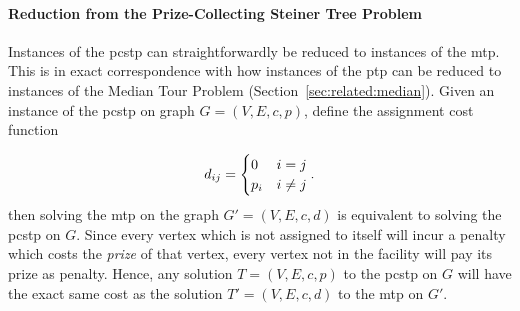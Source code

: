 \paragraph{Reduction from the Prize-Collecting Steiner Tree Problem}
Instances of the \gls{pcstp} can straightforwardly be reduced to instances of the \gls{mtp}. This is in exact correspondence
with how instances
of the \gls{ptp} can be reduced to instances of the Median Tour Problem (Section~\ref{sec:related:median}).
Given an instance of the \gls{pcstp} on graph $G = (V, E, c, p)$, define the assignment cost function

$$d_{ij} =
 \begin{cases}
   0 & i = j \\
   p_i & i \neq j
 \end{cases}\mathnormal{.}
 $$
 then solving the \gls{mtp} on the graph $G' = (V, E, c, d)$ is equivalent to solving the \gls{pcstp} on $G$. Since every
 vertex which is not assigned to itself will incur a penalty which costs the \textit{prize} of that vertex,
 every vertex not in the facility will pay its prize as penalty. Hence,
 any solution $T = (V, E, c, p)$ to the \gls{pcstp} on $G$ will have the exact
 same cost as the solution $T' = (V, E, c, d)$ to the \gls{mtp} on $G'$.

